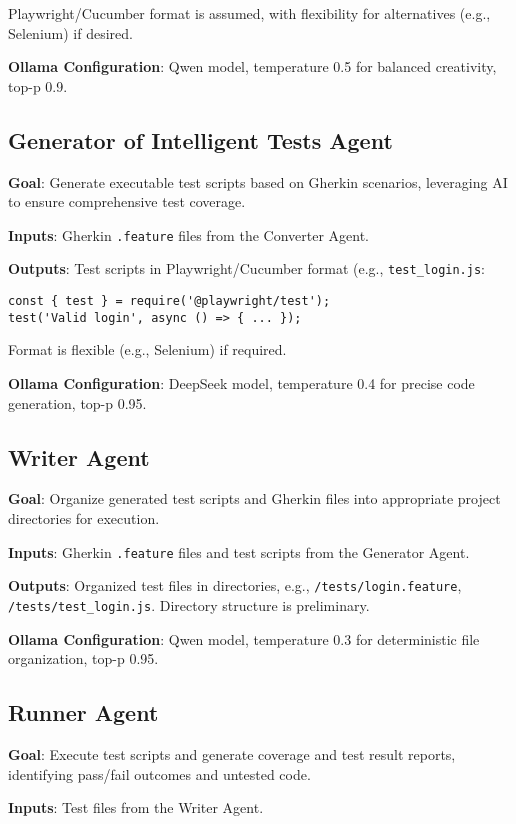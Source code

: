 \documentclass{article}
\begin{document}
Playwright/Cucumber format is assumed, with flexibility for alternatives (e.g., Selenium) if desired.

\textbf{Ollama Configuration}: Qwen model, temperature 0.5 for balanced creativity, top-p 0.9.

\subsection{Generator of Intelligent Tests Agent}
\textbf{Goal}: Generate executable test scripts based on Gherkin scenarios, leveraging AI to ensure comprehensive test coverage.

\textbf{Inputs}: Gherkin \texttt{.feature} files from the Converter Agent.

\textbf{Outputs}: Test scripts in Playwright/Cucumber format (e.g., \texttt{test\_login.js}:

\begin{verbatim}
const { test } = require('@playwright/test');
test('Valid login', async () => { ... });
\end{verbatim}

Format is flexible (e.g., Selenium) if required.

\textbf{Ollama Configuration}: DeepSeek model, temperature 0.4 for precise code generation, top-p 0.95.

\subsection{Writer Agent}
\textbf{Goal}: Organize generated test scripts and Gherkin files into appropriate project directories for execution.

\textbf{Inputs}: Gherkin \texttt{.feature} files and test scripts from the Generator Agent.

\textbf{Outputs}: Organized test files in directories, e.g., \texttt{/tests/login.feature}, \texttt{/tests/test\_login.js}. Directory structure is preliminary.

\textbf{Ollama Configuration}: Qwen model, temperature 0.3 for deterministic file organization, top-p 0.95.

\subsection{Runner Agent}
\textbf{Goal}: Execute test scripts and generate coverage and test result reports, identifying pass/fail outcomes and untested code.

\textbf{Inputs}: Test files from the Writer Agent.
\end{document}
